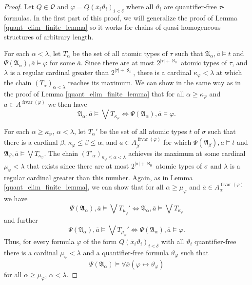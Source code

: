 \documentclass{ndjflart}
\theoremstyle{plain}
\theoremstyle{definition}
\numberwithin{equation}{section}
\DeclareMathOperator{\frvar}{frvar}
\begin{document}
\begin{proof}
Let $Q \in \mathcal{Q}$ and $\varphi = Q(\overline{x}_i\vartheta_i)_{i<\delta}$
where all $\vartheta_i$ are quantifier-free $\tau$-formulas.
In the first part of this proof, we will generalize the proof of Lemma
\ref{quant_elim_finite_lemma} so it works for chains of quasi-homogeneous
structures of arbitrary length.

For each $\alpha < \lambda$, let $T_{\alpha}$ be the set of all atomic 
types of $\tau$ such that $\mathfrak{A}_{\alpha}, \overline{a} \vDash t$
and $\Psi(\mathfrak{A}_{\alpha}), \overline{a} \vDash \varphi$ 
for some $\overline{a}$.
Since there are at most $2^{|\tau|+\aleph_0}$ atomic types of $\tau$,
and $\lambda$ is a regular cardinal greater than $2^{|\tau|+\aleph_0}$,
there is a cardinal $\kappa_{\varphi} < \lambda$ at which the chain 
$(T_{\alpha})_{\alpha < \lambda}$ reaches its maximum.
We can show in the same way as in the proof of 
Lemma \ref{quant_elim_finite_lemma} that for all 
$\alpha \geq \kappa_{\varphi}$ and 
$\overline{a} \in A^{\frvar(\varphi)}$ we then have
\[
	\mathfrak{A}_{\alpha}, \overline{a} \vDash \bigvee T_{\kappa_{\varphi}}
	\Leftrightarrow
	\Psi(\mathfrak{A}_{\alpha}), \overline{a} \vDash \varphi.
\]

For each $\alpha \geq \kappa_{\varphi}$, $\alpha < \lambda$, let $T_{\alpha}'$
be the set of all atomic types $t$ of $\sigma$ such that there is a cardinal 
$\beta$, $\kappa_{\varphi} \leq \beta \leq \alpha$, and
$\overline{a} \in A^{\frvar(\varphi)}_{\beta}$
for which
$\Psi(\mathfrak{A}_{\beta}), \overline{a} \vDash t$ and
$\mathfrak{A}_{\beta}, \overline{a} \vDash \bigvee T_{\kappa_{\varphi}}$.
The chain $(T'_{\alpha})_{\kappa_{\varphi} \leq \alpha < \lambda}$ achieves
its maximum at some cardinal $\mu_{\varphi} < \lambda$ that exists since
there are at most $2^{|\sigma| + \aleph_0}$ atomic types of $\sigma$
and $\lambda$ is a regular cardinal greater than this number.
Again, as in Lemma \ref{quant_elim_finite_lemma}, we can show that for all
$\alpha \geq \mu_{\varphi}$ and 
$\overline{a} \in A^{\frvar(\varphi)}_{\alpha}$ we have
\[
	\Psi(\mathfrak{A}_{\alpha}), \overline{a} \vDash \bigvee T_{\mu_{\varphi}}'
	\Leftrightarrow \mathfrak{A}_{\alpha}, \overline{a} \vDash \bigvee T_{\kappa_{\varphi}}
\]
and further
\[
	\Psi(\mathfrak{A}_{\alpha}), \overline{a} \vDash \bigvee T_{\mu_{\varphi}}'
	\Leftrightarrow \Psi(\mathfrak{A}_{\alpha}), \overline{a} \vDash \varphi.
\]
Thus, for every formula $\varphi$ of the form 
$Q(\overline{x}_i \vartheta_i)_{i < \delta}$ with all $\vartheta_i$
quantifier-free there is a cardinal $\mu_{\varphi} < \lambda$ and a 
quantifier-free formula $\vartheta_{\varphi}$ such that
\[
	\Psi(\mathfrak{A}_{\alpha}) \vDash 
	\forall \overline{x}(\varphi \leftrightarrow \vartheta_{\varphi})
\]
for all $\alpha \geq \mu_{\varphi}$, $\alpha < \lambda$.


\end{proof}
\end{document}
